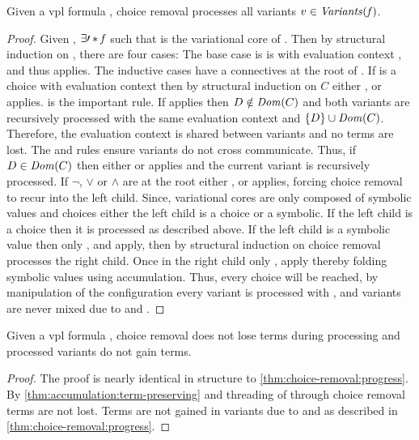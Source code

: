 \begin{theorem}
  \label{thm:choice-removal:progress}
  Given a \ac{vpl} formula \fV{}, choice removal processes all variants $v \in
  \mathit{Variants}(\mathit{f})$.
\end{theorem}
%
\begin{proof}
  Given \fV{}, $\exists \prime*{\mathit{f}}$ such that \prime*{\fV} is the variational
  core of \fV{}. Then by structural induction on \prime*{\fV{}}, there are four
  cases: The base case is \prime*{\fV} is \unit{} with evaluation context
  \inRoot{}, and thus \crEval{} applies. The inductive cases have a connectives
  at the root of \prime*{\fV}. If \prime*{\fV} is a choice with evaluation
  context \zV{} then by structural induction on $C$ either \crChc{}, \crChcT{}
  or \crChcF{} applies. \crChc{} is the important rule. If \crChc{} applies then
  $D \notin \mathit{Dom}({C})$ and both variants are recursively processed with the
  same evaluation context and $\set{D} \cup \domain{C}$. Therefore, the
  evaluation context is shared between variants and no terms are lost. The
  \crChcT{} and \crChcF{} rules ensure variants do not cross communicate. Thus,
  if $D \in \mathit{Dom}({C})$ then either \crChcT{} or \crChcF{} applies and the
  current variant is recursively processed. If $\neg$, $\vee$ or $\wedge$ are at
  the root either \crAnd{}, \crOr{} or \crNot{} applies, forcing choice removal
  to recur into the left child. Since, variational cores are only composed of
  symbolic values and choices either the left child is a choice or a symbolic.
  If the left child is a choice then it is processed as described above. If the
  left child is a symbolic value then only \crAndL{}, \crOrL{} and \crNotIn{}
  apply, then by structural induction on \zV{} choice removal processes the
  right child. Once in the right child only \crAndR{}, \crOrR{} apply thereby
  folding symbolic values using accumulation. Thus, every choice will be
  reached, by manipulation of the configuration every variant is processed with
  \crChc{}, and variants are never mixed due to \crChcT{} and \crChcF{}.
\end{proof}

\begin{theorem}
  \label{thm:choice-removal:preservation}
  Given a \ac{vpl} formula \fV{}, choice removal does not lose terms during
  processing \fV{} and processed variants do not gain terms.
\end{theorem}
%
\begin{proof}
  The proof is nearly identical in structure to
  \autoref{thm:choice-removal:progress}. By
  \autoref{thm:accumulation:term-preserving} and threading of \aStore{} through
  choice removal terms are not lost. Terms are not gained in variants due to
  \crChcT{} and \crChcF{} as described in \autoref{thm:choice-removal:progress}.
\end{proof}


